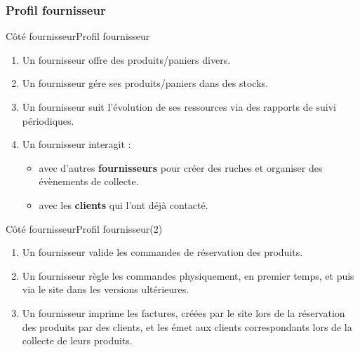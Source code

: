 \documentclass[usenames,dvipsnames]{beamer}
\begin{document}
\subsubsection*{Profil fournisseur}
\begin{frame}{Côté fournisseur}{Profil fournisseur}
\begin{enumerate}
  \item Un fournisseur offre des produits/paniers divers.
  \item Un fournisseur gére ses produits/paniers dans des stocks.
  \item Un fournisseur suit l'évolution de ses ressources via des rapports de suivi périodiques.
  \item Un fournisseur interagit :
  \begin{itemize}
    \item avec d'autres \textbf{fournisseurs} pour créer des ruches et organiser des évènements de collecte.
    \item avec les \textbf{clients} qui l'ont déjà contacté.
  \end{itemize}
\end{enumerate}
\end{frame}

\begin{frame}{Côté fournisseur}{Profil fournisseur($2$)}
\begin{enumerate}
  \item Un fournisseur valide les commandes de réservation des produits.
  \item Un fournisseur règle les commandes physiquement, en premier temps, et puis via le site dans les versions ultérieures.
  \item Un fournisseur imprime les factures, créées par le site lors de la réservation des produits par des clients, et les émet aux clients correspondants lors de la collecte de leurs produits.
\end{enumerate}
\end{frame}
\end{document}
